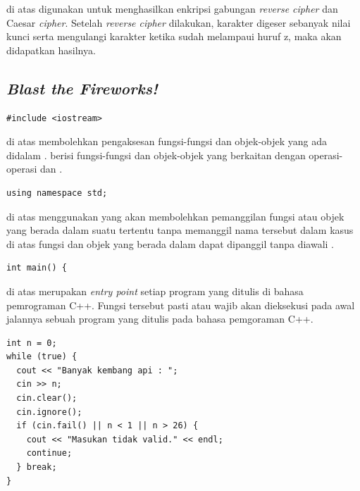 \documentclass{subfiles}
\begin{document}
{\Script} di atas digunakan untuk menghasilkan enkripsi gabungan \textit{reverse cipher} dan Caesar \textit{cipher}. Setelah \textit{reverse cipher} dilakukan, karakter digeser sebanyak nilai kunci serta mengulangi karakter ketika sudah melampaui huruf z, maka akan didapatkan hasilnya.

\subsection{\textit{Blast the Fireworks!}}

\begin{code}
\begin{verbatim}
#include <iostream>
\end{verbatim}
\end{code}

{\Script} di atas membolehkan pengaksesan fungsi-fungsi dan objek-objek yang ada didalam {\header} {\file} . {\Header} {\file}  berisi fungsi-fungsi dan objek-objek yang berkaitan dengan operasi-operasi {\ioi} dan {\ioo} {\stream}.

\begin{code}
\begin{verbatim}
using namespace std;
\end{verbatim}
\end{code}

{\Script} di atas menggunakan {\statement}  yang akan membolehkan pemanggilan fungsi atau objek yang berada dalam suatu  tertentu tanpa memanggil nama  tersebut dalam kasus di atas fungsi dan objek yang berada dalam  dapat dipanggil tanpa diawali .

\begin{code}
\begin{verbatim}
int main() {
\end{verbatim}
\end{code}

{\Script} di atas merupakan \textit{entry point} setiap program yang ditulis di bahasa pemrograman C++. Fungsi tersebut pasti atau wajib akan dieksekusi pada awal jalannya sebuah program yang ditulis pada bahasa pemgoraman C++.

\begin{code}
\begin{verbatim}
int n = 0;
while (true) {
  cout << "Banyak kembang api : ";
  cin >> n;
  cin.clear();
  cin.ignore();
  if (cin.fail() || n < 1 || n > 26) {
    cout << "Masukan tidak valid." << endl;
    continue;
  } break;
}
\end{verbatim}
\end{code}
\end{document}
